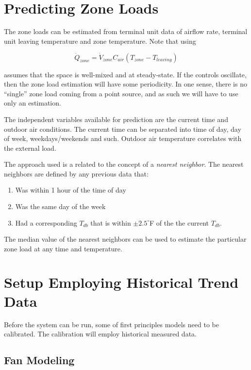 \section{Predicting Zone Loads}

The zone loads can be estimated from terminal unit data of airflow rate, terminal unit leaving temperature and zone temperature. Note that using 

\begin{equation}
\dot Q_{zone} = \dot V_{zone} C_{air} \left(T_{zone}-T_{leaving} \right)
\end{equation}

assumes that the space is well-mixed and at steady-state. If the controls oscillate, then the zone load estimation will have some periodicity. In one sense, there is no ``single'' zone load coming from a point source, and as such we will have to use only an estimation.

The independent variables available for prediction are the current time and outdoor air conditions. The current time can be separated into time of day, day of week, weekdays/weekends and such. Outdoor air temperature correlates with the external load. 

The approach used is a related to the concept of a \textit{nearest neighbor}. The nearest neighbors are defined by any previous data that:

\begin{enumerate}
\item Was within 1 hour of the time of day 
\item Was the same day of the week
\item Had a corresponding \(T_{db}\) that is within \(\pm 2.5^\circ\)F of the the current \(T_{db}\). 
\end{enumerate}

The median value of the nearest neighbors can be used to estimate the particular zone load at any time and temperature. 

\section{Setup Employing Historical Trend Data}

Before the system can be run, some of first principles models need to be calibrated. The calibration will employ historical measured data.

\subsection{Fan Modeling}

